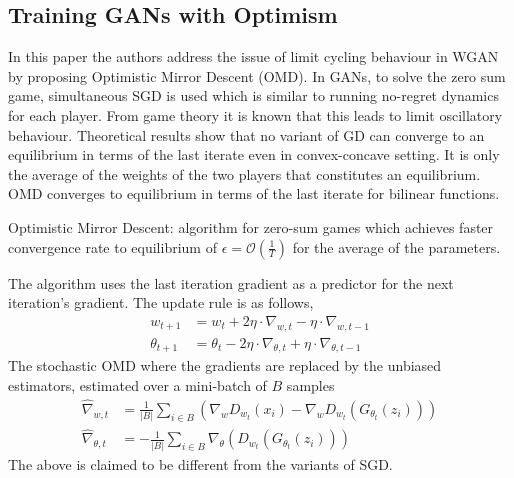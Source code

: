 \subsection*{Training GANs with Optimism \citep{optimism}}
In this paper the authors address the issue of limit cycling behaviour in WGAN by proposing Optimistic Mirror Descent (OMD).  In GANs, to solve the zero sum game, simultaneous SGD is used which is similar to running no-regret dynamics for each player.  From game theory it is known that this leads to limit oscillatory behaviour. Theoretical results show that no variant of GD can converge to an equilibrium in terms of the last iterate even in convex-concave setting.  It is only the average of the weights of the two players that constitutes an equilibrium. OMD converges to equilibrium in terms of the last iterate for bilinear functions.

Optimistic Mirror Descent: algorithm for zero-sum games which achieves faster convergence rate to equilibrium of $\epsilon = \mathcal{O}(\frac{1}{T})$  for the average of the parameters.

The algorithm uses the last iteration gradient as a predictor for the next iteration's gradient. The update rule is as follows,
$$
\begin{aligned} w_{t+1} &=w_{t}+2 \eta \cdot \nabla_{w, t}-\eta \cdot \nabla_{w, t-1} \\ \theta_{t+1} &=\theta_{t}-2 \eta \cdot \nabla_{\theta, t}+\eta \cdot \nabla_{\theta, t-1} \end{aligned}
$$
The stochastic OMD where the gradients are replaced by the unbiased estimators, estimated over a mini-batch of $B$ samples
$$ 
\begin{aligned} \hat{\nabla}_{w, t} &=\frac{1}{|B|} \sum_{i \in B}\left(\nabla_{w} D_{w_{t}}\left(x_{i}\right)-\nabla_{w} D_{w_{t}}\left(G_{\theta_{t}}\left(z_{i}\right)\right)\right) \\ \hat{\nabla}_{\theta, t} &=-\frac{1}{|B|} \sum_{i \in B} \nabla_{\theta}\left(D_{w_{t}}\left(G_{\theta_{t}}\left(z_{i}\right)\right)\right) \end{aligned}
$$
The above is claimed to be different from the variants of SGD.

